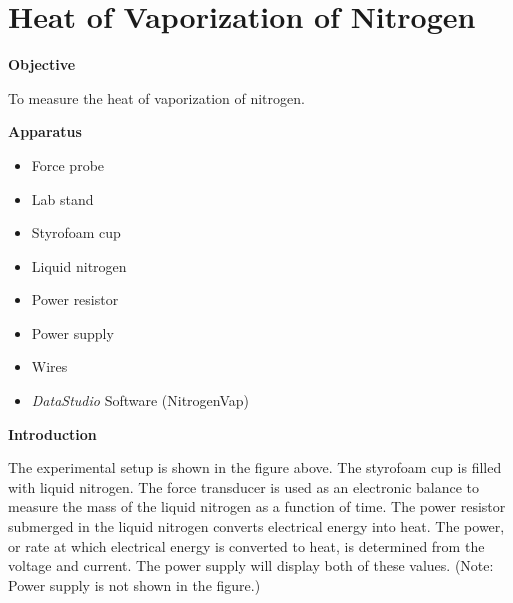 
\section{Heat of Vaporization of Nitrogen}

\makelabheader %

\textbf{Objective}

To measure the heat of vaporization of nitrogen.

\textbf{Apparatus}

\begin{itemize}
\item Force probe
\item Lab stand
\item Styrofoam cup
\item Liquid nitrogen
\item Power resistor
\item Power supply
\item Wires
\item \textit{DataStudio} Software (NitrogenVap)
\end{itemize}
\vspace{0.3cm}
{\centering {} \par}
\vspace{0.3cm}

\textbf{Introduction}

The experimental setup is shown in the figure above. The styrofoam
cup is filled with liquid nitrogen. The force transducer is used as
an electronic balance to measure the mass of the liquid nitrogen as
a function of time. The power resistor submerged in the liquid nitrogen
converts electrical energy into heat. The power, or rate at which
electrical energy is converted to heat, is determined from
the voltage and current.  The power supply will
display both of these values.
(Note: Power supply is
not shown in the figure.)

